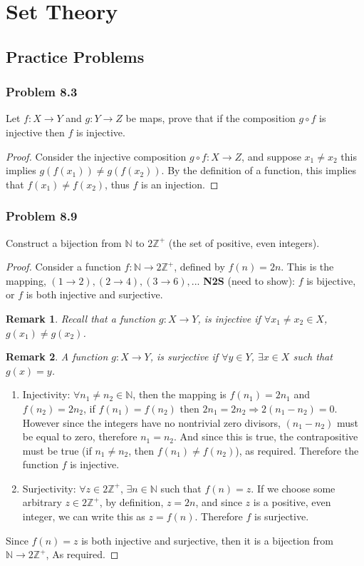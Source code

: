 \documentclass[hidelinks,12pt]{article}
\newtheorem*{remark}{Remark}
\newcommand{\N}{\mathbb{N}}
\newcommand{\Z}{\mathbb{Z}}
\begin{document}
\section{Set Theory}
\subsection{Practice Problems}
\subsubsection{Problem 8.3}
Let $f:X\to Y$ and $g:Y\to Z$ be maps, prove that if the composition $g\circ f$ is injective then $f$ is injective.
\begin{proof}
Consider the injective composition $g\circ f:X\to Z$, and suppose $x_1\neq x_2$ this implies $g(f(x_1))\neq g(f(x_2))$. By the definition of a function, this implies that $f(x_1)\neq f(x_2)$, thus $f$ is an injection.
\end{proof}
\subsubsection{Problem 8.9}
Construct a bijection from $\N$ to $2\Z^+$ (the set of positive, even integers).
\begin{proof}
Consider a function $f:\N\to2\Z^+$, defined by $f(n)=2n$. This is the mapping, $(1\to2), (2\to4),(3\to6),...$
\newline \textbf{N2S} (need to show): $f$ is bijective, or $f$ is both injective and surjective.
\begin{remark}
Recall that a function $g:X\to Y$, is injective if $\forall x_1\neq x_2\in X$, $g(x_1)\neq g(x_2)$.\end{remark}
\begin{remark}
A function $g:X\to Y$, is surjective if $\forall y\in Y$, $\exists x\in X$ such that $g(x)=y$.\end{remark}
\begin{enumerate}
    \item Injectivity: $\forall n_1\neq n_2\in\N$, then the mapping is $f(n_1)=2n_1$ and $f(n_2)=2n_2$, if $f(n_1)=f(n_2)$ then $2n_1=2n_2\Longrightarrow2(n_1-n_2)=0$. However since the integers have no nontrivial zero divisors, $(n_1-n_2)$ must be equal to zero, therefore $n_1=n_2$. And since this is true, the contrapositive must be true (if $n_1\neq n_2$, then $f(n_1)\neq f(n_2)$), as required. Therefore the function $f$ is injective.
    \item Surjectivity: $\forall z\in 2\Z^+$, $\exists n\in\N$ such that $f(n)=z$. If we choose some arbitrary $z\in2\Z^+$, by definition, $z=2n$, and since $z$ is a positive, even integer, we can write this as $z=f(n)$. Therefore $f$ is surjective.
\end{enumerate}
Since $f(n)=z$ is both injective and surjective, then it is a bijection from $\N\to2\Z^+$, As required.
\end{proof}
\end{document}
